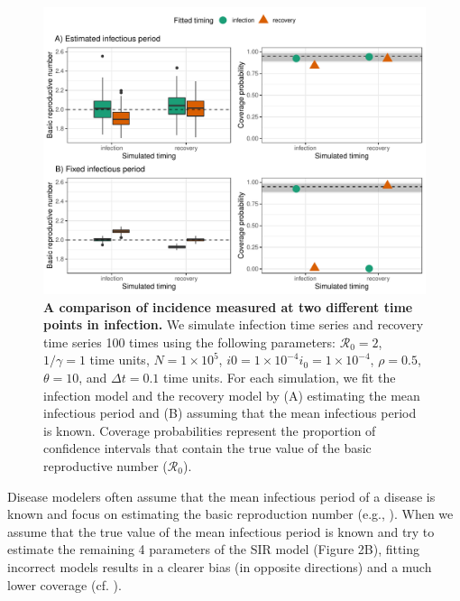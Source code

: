 \documentclass[12pt]{article}\usepackage[]{graphicx}\usepackage[]{color}
\providecommand{\DIFaddtex}[1]{{\protect\color{blue}\textbf{#1}}} %
\providecommand{\DIFdeltex}[1]{{\protect\color{red}\sout{#1}}}                      %
\providecommand{\DIFaddFL}[1]{\DIFadd{#1}} %
\providecommand{\DIFdelFL}[1]{\DIFdel{#1}} %
\providecommand{\DIFaddbeginFL}{} %
\providecommand{\DIFaddendFL}{} %
\providecommand{\DIFdelbeginFL}{} %
\providecommand{\DIFdelendFL}{} %
\providecommand{\DIFadd}[1]{\texorpdfstring{\DIFaddtex{#1}}{#1}} %
\providecommand{\DIFdel}[1]{\texorpdfstring{\DIFdeltex{#1}}{}} %
\newcommand{\DIFscaledelfig}{0.5}
\newlength{\DIFdelgraphicswidth} %
\newlength{\DIFdelgraphicsheight} %
\newcommand{\DIFaddincludegraphics}[2][]{{\color{blue}\fbox{\DIFOincludegraphics[#1]{#2}}}} %
\newcommand{\DIFdelincludegraphics}[2][]{%
\sbox{\DIFdelgraphicsbox}{\DIFOincludegraphics[#1]{#2}}%
\settoboxwidth{\DIFdelgraphicswidth}{\DIFdelgraphicsbox} %
\settoboxtotalheight{\DIFdelgraphicsheight}{\DIFdelgraphicsbox} %
\scalebox{\DIFscaledelfig}{%
\parbox[b]{\DIFdelgraphicswidth}{\usebox{\DIFdelgraphicsbox}\\[-\baselineskip] \rule{\DIFdelgraphicswidth}{0em}}\llap{\resizebox{\DIFdelgraphicswidth}{\DIFdelgraphicsheight}{%
\setlength{\unitlength}{\DIFdelgraphicswidth}%
\begin{picture}(1,1)%
\thicklines\linethickness{2pt} %
{\color[rgb]{1,0,0}\put(0,0){\framebox(1,1){}}}%
{\color[rgb]{1,0,0}\put(0,0){\line( 1,1){1}}}%
{\color[rgb]{1,0,0}\put(0,1){\line(1,-1){1}}}%
\end{picture}%
}\hspace*{3pt}}} %
} %
\DeclareRobustCommand{\DIFaddbeginFL}{\DIFOaddbeginFL \let\includegraphics\DIFaddincludegraphics} %
\DeclareRobustCommand{\DIFaddendFL}{\DIFOaddendFL \let\includegraphics\DIFOincludegraphics} %
\DeclareRobustCommand{\DIFdelbeginFL}{\DIFOdelbeginFL \let\includegraphics\DIFdelincludegraphics} %
\DeclareRobustCommand{\DIFdelendFL}{\DIFOaddendFL \let\includegraphics\DIFOincludegraphics} %
\begin{document}
\begin{figure}
\DIFdelbeginFL %
\DIFdelendFL \DIFaddbeginFL \includegraphics[width=\textwidth]{compare_deterministic.pdf}
\DIFaddendFL \caption{
\textbf{A comparison of incidence measured at two different time points in infection.}
We simulate infection time series and recovery time series 100 times using the 
following parameters:  
$\mathcal R_0 = 2$, $1/\gamma = 1$ time units, $N = 1 \times 10^5$, \DIFdelbeginFL \DIFdelFL{$i0 = 1 \times 10^{-4}$}\DIFdelendFL \DIFaddbeginFL \DIFaddFL{$i_0 = 1 \times 10^{-4}$}\DIFaddendFL ,
$\rho = 0.5$, $\theta = 10$, and $\Delta t = 0.1$ time units.
For each simulation, we fit the infection model and the recovery model by
(A) estimating the mean infectious period and (B) assuming
that the mean infectious period is known.
Coverage probabilities represent the proportion of confidence intervals
that contain the true value of the basic reproductive number ($\mathcal R_0$).
}
\end{figure}

Disease modelers often assume that the mean infectious period of a disease
is known and focus on estimating the basic reproduction number (e.g.,
\cite{hooker2010parameterizing, lin2016seasonality, pons2018serotype}). 
When we assume that the true value of the mean infectious period is known
and try to estimate the remaining 4 parameters of the SIR model (Figure 2B), fitting
incorrect models results in a clearer bias (in opposite directions)
and a much lower coverage (cf. \cite{elderd2006uncertainty}).
\end{document}
